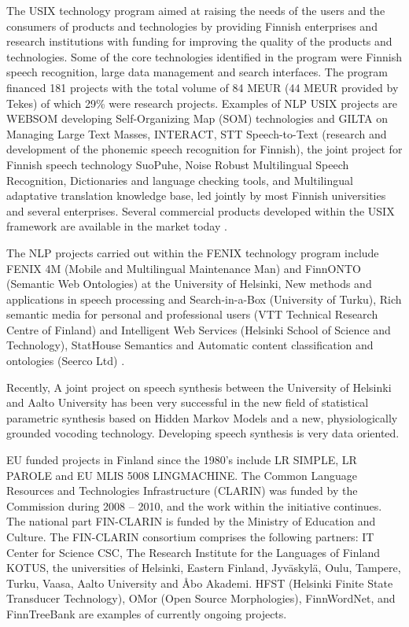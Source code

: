 \documentclass[]{../../metanetpaper}
\begin{document}
\begin{Parallel}[c]{77mm}{77mm}
{The USIX technology program aimed at raising the needs of the users and the
consumers of products and technologies by providing Finnish enterprises and
research institutions with funding for improving the quality of the products
and technologies. Some of the core technologies identified in the program were
Finnish speech recognition, large data management and search interfaces. The
program financed 181 projects with the total volume of 84 MEUR (44 MEUR
provided by Tekes) of which 29\% were research projects. Examples of NLP USIX
projects are WEBSOM developing Self-Organizing Map (SOM) technologies and GILTA
on Managing Large Text Masses, INTERACT, STT Speech-to-Text (research and
development of the phonemic speech recognition for Finnish), the joint project
for Finnish speech technology SuoPuhe, Noise Robust Multilingual Speech
Recognition, Dictionaries and language checking tools, and Multilingual
adaptative translation knowledge base, led jointly by most Finnish universities
and several enterprises. Several commercial products developed within the USIX
framework are available in the market today \cite{LoppuUSIX}.

The NLP projects carried out within the FENIX technology program include FENIX
4M (Mobile and Multilingual Maintenance Man) and FinnONTO (Semantic Web
Ontologies) at the University of Helsinki, New methods and applications in
speech processing and Search-in-a-Box (University of Turku), Rich semantic
media for personal and professional users (VTT Technical Research Centre of
Finland) and Intelligent Web Services (Helsinki School of Science and
Technology), StatHouse Semantics and Automatic content classification and
ontologies (Seerco Ltd) \cite{FinalFENIX}.

Recently, A joint project on speech synthesis between the University of
Helsinki and Aalto University has been very successful in the new field of
statistical parametric synthesis based on Hidden Markov Models and a new,
physiologically grounded vocoding technology. Developing speech synthesis is
very data oriented.

EU funded projects in Finland since the 1980’s include LR SIMPLE, LR
PAROLE and EU MLIS 5008 LINGMACHINE.  The Common Language Resources
and Technologies Infrastructure (CLARIN) was funded by the Commission
during 2008 – 2010, and the work within the initiative continues. The
national part FIN-CLARIN is funded by the Ministry of Education and
Culture. The FIN-CLARIN consortium comprises the following partners:
IT Center for Science CSC, The Research Institute for the Languages of
Finland KOTUS, the universities of Helsinki, Eastern Finland,
Jyväskylä, Oulu, Tampere, Turku, Vaasa, Aalto University and Åbo
Akademi. HFST (Helsinki Finite State Transducer Technology), OMor
(Open Source Morphologies), FinnWordNet, and FinnTreeBank are examples
of currently ongoing projects.

}
\end{Parallel}
\end{document}
